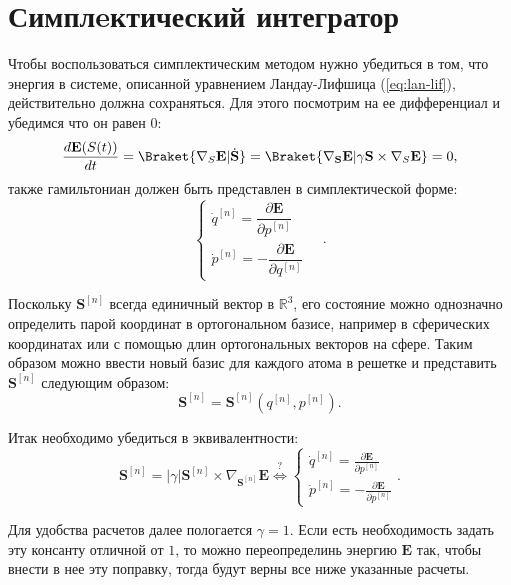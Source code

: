 \section{Симплeктический интегратор}\label{sec:symplectic-integrator}
Чтобы воспользоваться симплектическим методом нужно убедиться в том,
что энергия в системе, описанной уравнением Ландау-Лифшица (\ref{eq:lan-lif}),
действительно должна сохраняться. Для этого посмотрим на ее дифференциал и
убедимся что он равен $0$:
\begin{equation}
    \frac{d\mathbf E(S(t))}{dt} =
    \Braket{\nabla_S \mathbf E | \dot{\mathbf S} } =
    \Braket{\nabla_\mathbf S \mathbf E| \gamma \mathbf S \times \nabla_S
    \mathbf E
    } = 0,
\end{equation}
также гамильтониан должен быть представлен в симплектической форме:
\begin{equation}\label{eq:ham_sym_form}
    \begin{cases}
        \dot q^{[n]} = \dfrac{\partial \mathbf E}{\partial p^{[n]}}
        \\
        \dot p^{[n]} = - \dfrac{\partial \mathbf E}{\partial q^{[n]}}
    \end{cases}\quad.
\end{equation}

Поскольку $\mathbf S^{[n]}$ всегда единичный вектор в $\mathds R^3$, его
состояние можно однозначно определить парой координат в ортогональном базисе,
например в сферических координатах или с помощью длин ортогональных векторов на
сфере. Таким образом можно ввести новый базис для каждого атома в решетке и
представить $\mathbf S^{[n]}$
следующим образом:
\begin{equation}
    \mathbf S^{[n]} = \mathbf S^{[n]}(q^{[n]}, p^{[n]}).
\end{equation}

Итак необходимо убедиться в эквивалентности:
\begin{equation}\label{eq:is_ham_split_eq}
    \mathbf S^{[n]} = |\gamma| \mathbf S^{[n]}\times \nabla_{\mathbf S^{[n]}}
    \mathbf E
    \overset{?}{\Leftrightarrow}
    \begin{cases}
        \dot q^{[n]} = \frac{\partial \mathbf E}{\partial p^{[n]}}
        \\
        \dot p^{[n]} = -\frac{\partial \mathbf E}{\partial p^{[n]}}
    \end{cases}.
\end{equation}

Для удобства расчетов далее пологается $\gamma=1$. Если есть необходимость
задать эту консанту отличной от $1$, то можно переопределинь энергию $\mathbf
E$ так, чтобы внести в нее эту поправку, тогда будут верны все ниже указанные
расчеты.

